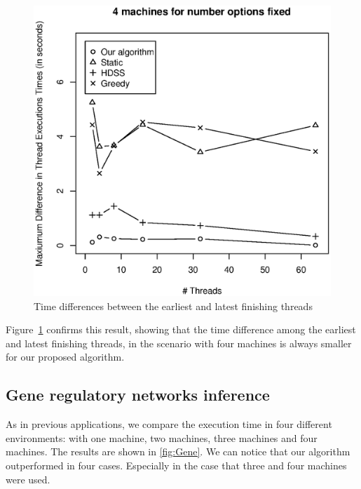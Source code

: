 \documentclass[journal]{IEEEtran}
\begin{document}
\begin{figure}[htb]
	\begin{center}
	\centering
			\includegraphics[scale=0.4]{Maxima_Diferenca_BlackScholes.eps}
	\caption{Time differences between the earliest and latest finishing threads}
	\label{fig:diferencaThreadsBlack}
	\end{center}
\end{figure}

Figure~\ref{fig:diferencaThreadsBlack} confirms this result, showing that the
time difference among the earliest and latest finishing threads, in the
scenario with four machines is always smaller for our proposed algorithm.


\subsection{Gene regulatory networks inference}

As in previous applications, we compare the execution time in four different environments: with  one machine, two machines, three machines and four machines. The results are shown in \ref{fig:Gene}. We can notice that our algorithm outperformed in four cases. Especially in the case that three and four machines were used. 
\end{document}
